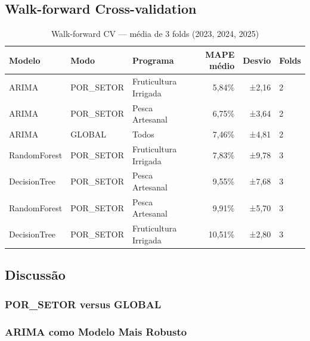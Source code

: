 \documentclass[12pt, a4paper]{article}
\begin{document}
\subsection{Walk-forward Cross-validation}

\begin{table}[H]
  \centering
  \caption{Walk-forward CV — média de 3 folds (2023, 2024, 2025)}
  \label{tab:resultados_cv}
  \begin{tabular}{lllrrl}
    \toprule
    \textbf{Modelo}   & \textbf{Modo} & \textbf{Programa}       & \textbf{MAPE médio} & \textbf{Desvio} & \textbf{Folds} \\
    \midrule
    ARIMA             & POR\_SETOR    & Fruticultura Irrigada   & 5,84\%              & ±2,16           & 2 \\
    ARIMA             & POR\_SETOR    & Pesca Artesanal         & 6,75\%              & ±3,64           & 2 \\
    ARIMA             & GLOBAL        & Todos                   & 7,46\%              & ±4,81           & 2 \\
    RandomForest      & POR\_SETOR    & Fruticultura Irrigada   & 7,83\%              & ±9,78           & 3 \\
    DecisionTree      & POR\_SETOR    & Pesca Artesanal         & 9,55\%              & ±7,68           & 3 \\
    RandomForest      & POR\_SETOR    & Pesca Artesanal         & 9,91\%              & ±5,70           & 3 \\
    DecisionTree      & POR\_SETOR    & Fruticultura Irrigada   & 10,51\%             & ±2,80           & 3 \\
    \bottomrule
  \end{tabular}
\end{table}

\subsection{Discussão}

\subsubsection{POR\_SETOR versus GLOBAL}

\subsubsection{ARIMA como Modelo Mais Robusto}
\end{document}
